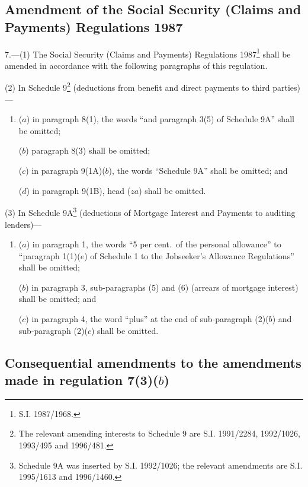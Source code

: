 \documentclass[12pt,a4paper]{article}
\begin{document}
\subsection[7. Amendment of the Social Security (Claims and Payments) Regulations 1987]{Amendment of the Social Security (Claims and Payments) Regulations 1987}

7.—(1) The Social Security (Claims and Payments) Regulations 1987\footnote{\frenchspacing S.I. 1987/1968.} shall be amended in accordance with the following paragraphs of this regulation.

(2) In Schedule 9\footnote{\frenchspacing The relevant amending interests to Schedule 9 are S.I. 1991/2284, 1992/1026, 1993/495 and 1996/481.} (deductions from benefit and direct payments to third parties)—
\begin{enumerate}\item[]
($a$) in paragraph 8(1), the words “and paragraph 3(5) of Schedule 9A” shall be omitted;

($b$) paragraph 8(3) shall be omitted;

($c$) in paragraph 9(1A)($b$), the words “Schedule 9A” shall be omitted; and

($d$) in paragraph 9(1B), head ($za$) shall be omitted.
\end{enumerate}

(3) In Schedule 9A\footnote{\frenchspacing Schedule 9A was inserted by S.I. 1992/1026; the relevant amendments are S.I. 1995/1613 and 1996/1460.} (deductions of Mortgage Interest and Payments to auditing lenders)—
\begin{enumerate}\item[]
($a$) in paragraph 1, the words “5 per cent.\ of the personal allowance” to “paragraph 1(1)($e$) of Schedule 1 to the Jobseeker’s Allowance Regulations” shall be omitted;

($b$) in paragraph 3, sub-paragraphs (5) and (6) (arrears of mortgage interest) shall be omitted; and

($c$) in paragraph 4, the word “plus” at the end of sub-paragraph (2)($b$) and sub-paragraph (2)($c$) shall be omitted.
\end{enumerate}

\subsection[8. Consequential amendments to the amendments made in regulation 7(3)($b$)]{Consequential amendments to the amendments made in regulation 7(3)($b$)}
\end{document}
